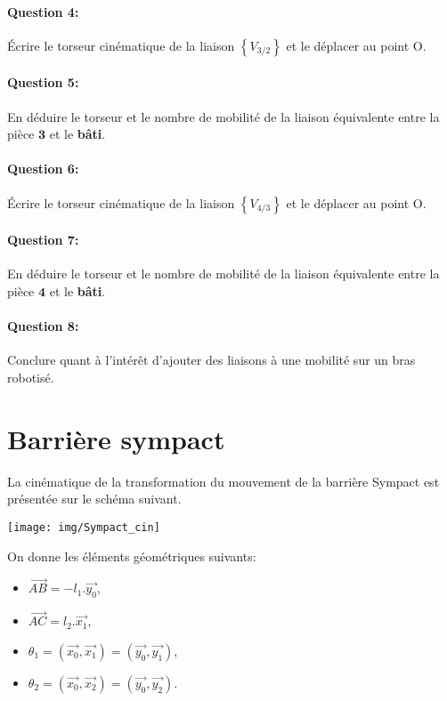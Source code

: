 \paragraph{Question 4:} Écrire le torseur cinématique de la liaison $\left\{V_{3/2}\right\}$ et le déplacer au point O.

\paragraph{Question 5:} En déduire le torseur et le nombre de mobilité de la liaison équivalente entre la pièce $\textbf{3}$ et le \textbf{bâti}.

\paragraph{Question 6:} Écrire le torseur cinématique de la liaison $\left\{V_{4/3}\right\}$ et le déplacer au point O.

\paragraph{Question 7:} En déduire le torseur et le nombre de mobilité de la liaison équivalente entre la pièce $\textbf{4}$ et le \textbf{bâti}.\\

\paragraph{Question 8:} Conclure quant à l'intérêt d'ajouter des liaisons à une mobilité sur un bras robotisé.

\newpage

\section{Barrière sympact}

La cinématique de la transformation du mouvement de la barrière Sympact est présentée sur le schéma suivant.

\begin{center}
 \texttt{[image: img/Sympact\_cin]}
\end{center}

On donne les éléments géométriques suivants:
\begin{itemize}
 \item $\overrightarrow{AB}=-l_1.\overrightarrow{y_0}$,
 \item $\overrightarrow{AC}=l_2.\overrightarrow{x_1}$,
 \item $\theta_1=(\overrightarrow{x_0},\overrightarrow{x_1})=(\overrightarrow{y_0},\overrightarrow{y_1})$,
 \item $\theta_2=(\overrightarrow{x_0},\overrightarrow{x_2})=(\overrightarrow{y_0},\overrightarrow{y_2})$.
\end{itemize}

